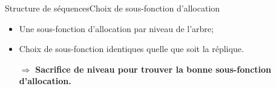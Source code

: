\begin{frame}{Structure de séquences}{Choix de sous-fonction d'allocation}

  \hspace{-1cm}
  \begin{minipage}{0.45\textwidth}
    \begin{center}
      
    \end{center}
  \end{minipage}
  \hfill
  \begin{minipage}{0.45\textwidth}
    \begin{center}
      
    \end{center}
  \end{minipage}

  \vspace{0.5cm}
  
  \begin{itemize}
  \item Une sous-fonction d'allocation par niveau de l'arbre;
  \item Choix de sous-fonction identiques quelle que soit la réplique.
  \end{itemize}

  \vspace{0.5cm}

  \large
  \begin{itemize}
  \item [$\Rightarrow$] \textbf{Sacrifice de niveau pour trouver la bonne sous-fonction
    d'allocation.}
  \end{itemize}

\end{frame}

